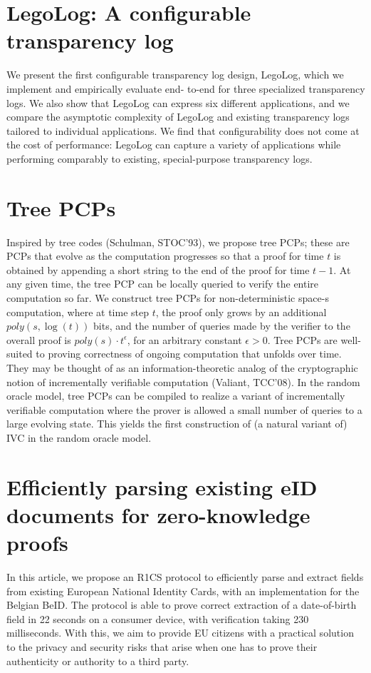 \documentclass[11pt]{article}
\theoremstyle{definition}
\theoremstyle{remark}
\theoremstyle{plain}
\begin{document}
\section{\cite{cryptoeprint:2025/1234} {LegoLog}: A configurable transparency log}
We present the first configurable transparency log design,
LegoLog, which we implement and empirically evaluate end-
to-end for three specialized transparency logs. We also show
that LegoLog can express six different applications, and
we compare the asymptotic complexity of LegoLog and
existing transparency logs tailored to individual applications.
We find that configurability does not come at the cost of
performance: LegoLog can capture a variety of applications
while performing comparably to existing, special-purpose
transparency logs.

\section{\cite{cryptoeprint:2025/1252} Tree {PCPs}}

Inspired by tree codes (Schulman, STOC'93), we propose tree PCPs; these are PCPs that evolve as the computation progresses so that a proof for time $t$ is obtained by appending a short string to the end of the proof for time $t-1$. At any given time, the tree PCP can be locally queried to verify the entire computation so far.
We construct tree PCPs for non-deterministic space-s computation, where at time step $t$, the proof only grows by an additional $p o l y(s, \log (t))$ bits, and the number of queries made by the verifier to the overall proof is $p o l y(s) \cdot t^\epsilon$, for an arbitrary constant $\epsilon>0$.
Tree PCPs are well-suited to proving correctness of ongoing computation that unfolds over time. They may be thought of as an information-theoretic analog of the cryptographic notion of incrementally verifiable computation (Valiant, TCC'08). In the random oracle model, tree PCPs can be compiled to realize a variant of incrementally verifiable computation where the prover is allowed a small number of queries to a large evolving state. This yields the first construction of (a natural variant of) IVC in the random oracle model.

\section{\cite{cryptoeprint:2025/1266} Efficiently parsing existing {eID} documents for zero-knowledge proofs}
In this article, we propose an R1CS protocol to efficiently parse and extract fields from existing European National Identity Cards, with an implementation for the Belgian BeID.
The protocol is able to prove correct extraction of a date-of-birth field in 22 seconds on a consumer device, with verification taking 230 milliseconds. With this, we aim to provide EU citizens with a practical solution to the privacy and security risks that arise when one has to prove their authenticity or authority to a third party.
\end{document}
